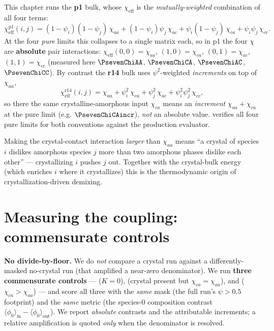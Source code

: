 This chapter runs the \textbf{p1} bulk, whose $\chi_{\text{eff}}$ is the
\emph{mutually-weighted} combination of all four terms:
%
\begin{equation}
  \chi_{\text{eff}}^{\text{p1}}(i,j) =
    (1-\psi_i)(1-\psi_j)\,\chi_{aa} + (1-\psi_i)\psi_j\,\chi_{ac}
  + \psi_i(1-\psi_j)\,\chi_{ca} + \psi_i\psi_j\,\chi_{cc}.
\end{equation}
%
At the four \emph{pure} limits this collapses to a single matrix each, so
in p1 the four $\chi$ are \textbf{absolute} pair interactions:
$\chi_{\text{eff}}(0,0)=\chi_{aa}$, $(1,0)=\chi_{ca}$, $(0,1)=\chi_{ac}$,
$(1,1)=\chi_{cc}$ (measured here $\ensuremath{\PsevenChiAA}$,
$\ensuremath{\PsevenChiCA}$, $\ensuremath{\PsevenChiAC}$,
$\ensuremath{\PsevenChiCC}$). By contrast the \textbf{r14} bulk uses
$\psi^2$-weighted \emph{increments} on top of $\chi_{aa}$,
%
\begin{equation}
  \chi_{\text{eff}}^{\text{r14}}(i,j) = \chi_{aa}
   + \psi_i^2\,\chi_{ca} + \psi_j^2\,\chi_{ac}
   + \psi_i^2\psi_j^2\,\chi_{cc},
\end{equation}
%
so there the same crystalline-amorphous input $\chi_{ca}$ means an
\emph{increment} $\chi_{aa}+\chi_{ca}$ at the pure limit (e.g.
$\ensuremath{\PsevenChiCAincr}$), \emph{not} an absolute value.
 verifies all four pure limits for both
conventions against the production evaluator.

Making the crystal-contact interaction \emph{larger} than $\chi_{aa}$
means ``a crystal of species $i$ dislikes amorphous species $j$ more than
two amorphous phases dislike each other'' --- crystallizing $i$ pushes $j$
out. Together with the crystal-bulk energy (which enriches $i$ where it
crystallizes) this is the thermodynamic origin of crystallization-driven
demixing.

\section{Measuring the coupling: commensurate controls}

\begin{keybox}
\textbf{No divide-by-floor.} We do \emph{not} compare a crystal run against
a differently-masked no-crystal run (that amplified a
near-zero denominator). We run \textbf{three commensurate controls} ---
 ($K{=}0$),  (crystal present but
$\chi_{ca}{=}\chi_{aa}$), and  ($\chi_{ca}{>}\chi_{aa}$) --- and
score all three with the \emph{same} mask (the full run's $\psi>0.5$
footprint) and the \emph{same} metric (the species-0 composition contrast
$\langle\phi_0\rangle_{\text{in}}-\langle\phi_0\rangle_{\text{out}}$). We
report \emph{absolute} contrasts and the attributable increments; a
relative amplification is quoted \emph{only} when the denominator is
resolved.
\end{keybox}

